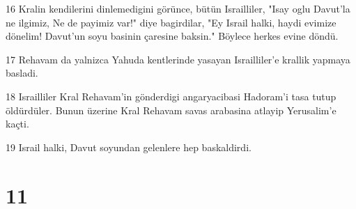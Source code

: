 \par 16 Kralin kendilerini dinlemedigini görünce, bütün Israilliler, "Isay oglu Davut'la ne ilgimiz, Ne de payimiz var!" diye bagirdilar, "Ey Israil halki, haydi evimize dönelim! Davut'un soyu basinin çaresine baksin." Böylece herkes evine döndü.
\par 17 Rehavam da yalnizca Yahuda kentlerinde yasayan Israilliler'e krallik yapmaya basladi.
\par 18 Israilliler Kral Rehavam'in gönderdigi angaryacibasi Hadoram'i tasa tutup öldürdüler. Bunun üzerine Kral Rehavam savas arabasina atlayip Yerusalim'e kaçti.
\par 19 Israil halki, Davut soyundan gelenlere hep baskaldirdi.

\chapter{11}

